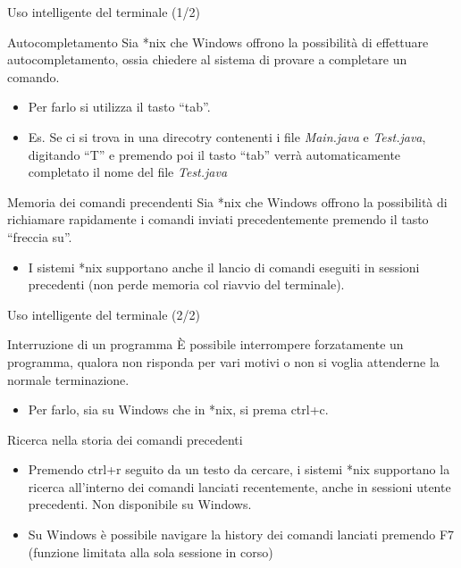 \documentclass[presentation]{beamer}
\begin{document}
\begin{frame}[fragile]{Uso intelligente del terminale (1/2)}
  \begin{block}{Autocompletamento}
    \scriptsize{}
    Sia *nix che Windows offrono la possibilità di effettuare autocompletamento, ossia chiedere al sistema di provare a completare un comando. 
	\begin{itemize}
	\item Per farlo si utilizza il tasto ``tab''.
	\item Es. Se ci si trova in una direcotry contenenti i file \emph{Main.java} e \emph{Test.java}, digitando ``T'' e premendo poi il tasto ``tab'' verrà automaticamente completato il nome del file \emph{Test.java}
\end{itemize}	    
  \end{block}
  \vfill
  \begin{block}{Memoria dei comandi precendenti}
    \scriptsize{}
    Sia *nix che Windows offrono la possibilità di richiamare rapidamente i comandi inviati precedentemente premendo il tasto ``freccia su''. 
\begin{itemize}
\item  I sistemi *nix supportano anche il lancio di comandi eseguiti in sessioni precedenti (non perde memoria col riavvio del terminale). 
\end{itemize}    
   
  \end{block}

\end{frame}

\begin{frame}[fragile]{Uso intelligente del terminale (2/2)}
  \begin{block}{Interruzione di un programma}
    \scriptsize{}
    È possibile interrompere forzatamente un programma, qualora non risponda per vari motivi o non si voglia attenderne la normale terminazione. 

\begin{itemize}
\item Per farlo, sia su Windows che in *nix, si prema ctrl+c.
\end{itemize}    
  \end{block}
  \vfill
  \begin{block}{Ricerca nella storia dei comandi precedenti}
    \scriptsize{}
    \begin{itemize}
    \item Premendo ctrl+r seguito da un testo da cercare, i sistemi *nix supportano la ricerca all'interno dei comandi lanciati recentemente, anche in sessioni utente precedenti. Non disponibile su Windows.
    \item Su Windows è possibile navigare la history dei comandi lanciati premendo F7 (funzione limitata alla sola sessione in corso)
    \end{itemize}

  \end{block}
\end{frame}
\end{document}
